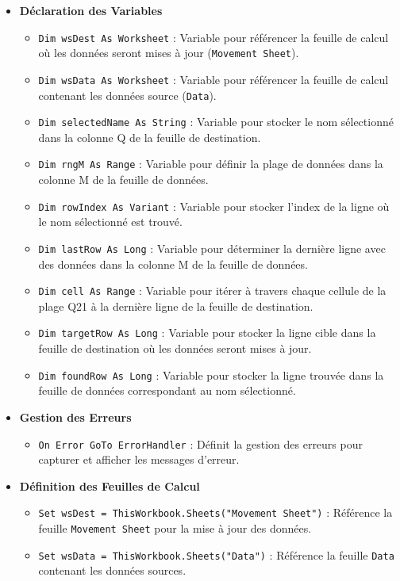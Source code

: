 \documentclass[a4paper, oneside, 12pt, final]{extreport}
\begin{document}
\begin{itemize}
    \item \textbf{Déclaration des Variables}
    \begin{itemize}
        \item \texttt{Dim wsDest As Worksheet} : Variable pour référencer la feuille de calcul où les données seront mises à jour (\texttt{Movement Sheet}).
        \item \texttt{Dim wsData As Worksheet} : Variable pour référencer la feuille de calcul contenant les données source (\texttt{Data}).
        \item \texttt{Dim selectedName As String} : Variable pour stocker le nom sélectionné dans la colonne Q de la feuille de destination.
        \item \texttt{Dim rngM As Range} : Variable pour définir la plage de données dans la colonne M de la feuille de données.
        \item \texttt{Dim rowIndex As Variant} : Variable pour stocker l'index de la ligne où le nom sélectionné est trouvé.
        \item \texttt{Dim lastRow As Long} : Variable pour déterminer la dernière ligne avec des données dans la colonne M de la feuille de données.
        \item \texttt{Dim cell As Range} : Variable pour itérer à travers chaque cellule de la plage Q21 à la dernière ligne de la feuille de destination.
        \item \texttt{Dim targetRow As Long} : Variable pour stocker la ligne cible dans la feuille de destination où les données seront mises à jour.
        \item \texttt{Dim foundRow As Long} : Variable pour stocker la ligne trouvée dans la feuille de données correspondant au nom sélectionné.
    \end{itemize}

    \item \textbf{Gestion des Erreurs}
    \begin{itemize}
        \item \texttt{On Error GoTo ErrorHandler} : Définit la gestion des erreurs pour capturer et afficher les messages d'erreur.
    \end{itemize}

    \item \textbf{Définition des Feuilles de Calcul}
    \begin{itemize}
        \item \texttt{Set wsDest = ThisWorkbook.Sheets("Movement Sheet")} : Référence la feuille \texttt{Movement Sheet} pour la mise à jour des données.
        \item \texttt{Set wsData = ThisWorkbook.Sheets("Data")} : Référence la feuille \texttt{Data} contenant les données sources.
    \end{itemize}


\end{itemize}
\end{document}
